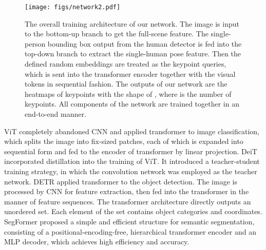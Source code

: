 \documentclass[runningheads]{llncs}
\begin{document}
\begin{figure*}
  \centering
  \texttt{[image: figs/network2.pdf]} 
  \caption{The overall training architecture of our network. The image is input to the bottom-up branch to get the full-scene feature. The single-person bounding box output from the human detector is fed into the top-down branch to extract the single-human pose feature. Then the defined random embeddings are treated as the keypoint queries, which is sent into the transformer encoder together with the visual tokens in sequential fashion. The outputs of our network are the heatmaps of keypoints with the shape of , where  is the number of keypoints. All components of the network are trained together in an end-to-end manner.}
  \label{overall_architecture}
\end{figure*}

ViT \cite{VIT2020} completely abandoned CNN and applied transformer to image classification, which splits the image into fix-sized patches, each of which is expanded into sequential form and fed to the encoder of transformer by linear projection. DeiT \cite{DEiT2021} incorporated distillation into the training of ViT. It introduced a teacher-student training strategy, in which the convolution network was employed as the teacher network. 
DETR \cite{DETR2020} applied transformer to the object detection. The image is processed by CNN for feature extraction, then fed into the transformer in the manner of feature sequences. The transformer architecture directly outputs an unordered set. Each element of the set contains object categories and coordinates. SegFormer \cite{segformer2021} proposed a simple and efficient structure for semantic segmentation, consisting of a positional-encoding-free, hierarchical transformer encoder and an MLP decoder, which achieves high efficiency and accuracy.
\end{document}
